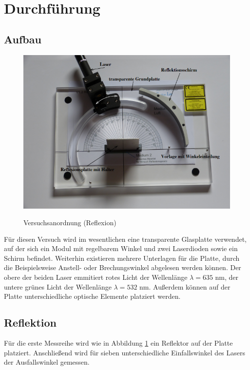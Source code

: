 \section{Durchführung}
\subsection{Aufbau}
\begin{figure} [h]
    \centering
    \includegraphics[width=12cm, keepaspectratio]{Reflexion Aufbau}
    \label{fig:Reflexion}
    \caption{Versuchsanordnung (Reflexion)}
 \end{figure}
Für diesen Versuch wird im wesentlichen eine transparente Glasplatte verwendet, auf der sich ein Modul mit regelbarem Winkel und zwei Laserdioden sowie ein Schirm befindet. Weiterhin existieren mehrere Unterlagen für die Platte, durch die Beispielsweise Anstell- oder Brechungswinkel abgelesen werden können. Der obere der beiden Laser emmitiert rotes Licht der Wellenlänge  $\lambda=635$ nm, der untere grünes Licht der Wellenlänge $\lambda=532$ nm. Außerdem können auf der Platte unterschiedliche optische Elemente platziert werden.
\subsection{Reflektion}
Für die erste Messreihe wird wie in Abbildung \ref{fig:Reflexion} ein Reflektor auf der Platte platziert. Anschließend wird für sieben unterschiedliche Einfallswinkel des Lasers der Ausfallswinkel gemessen.

